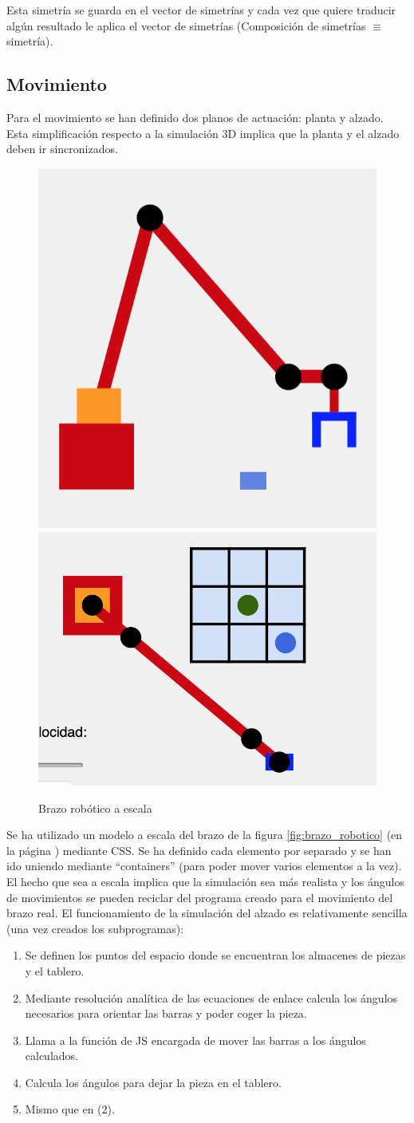 \documentclass[11pt]{article}
\begin{document}
Esta simetría se guarda en el vector de simetrías y cada vez que quiere traducir
algún resultado le aplica el vector de simetrías (Composición de simetrías $\equiv$
simetría).

\subsection{Movimiento}

Para el movimiento se han definido dos planos de actuación: planta y
alzado. Esta simplificación respecto a la simulación 3D implica que la planta y
el alzado deben ir sincronizados. \\

\begin{figure}[htbp]
  \centering
  \includegraphics[width = .3\textwidth]{Brazo_escala.png}
  \hspace{1.5cm}
  \includegraphics[width = .3\textwidth]{Planta_robot_escala.png}
  \caption{Brazo robótico a escala}
  \label{fig:brazo_escala}
\end{figure}

Se ha utilizado un modelo a escala del brazo de la figura
\ref{fig:brazo_robotico} (en la página \pageref{fig:brazo_robotico}) mediante
CSS. Se ha definido cada elemento por separado y se han ido uniendo mediante
``containers'' (para poder mover varios elementos a la vez). \\

El hecho que sea a escala implica que la simulación sea más realista y los
ángulos de movimientos se pueden reciclar del programa creado para el movimiento
del brazo real. El funcionamiento de la simulación del alzado es relativamente
sencilla (una vez creados los subprogramas):

\begin{enumerate}
  \item Se definen los puntos del espacio donde se encuentran los almacenes de
  piezas y el tablero.
  \item Mediante resolución analítica de las ecuaciones de enlace calcula los
  ángulos necesarios para orientar las barras y poder coger la pieza.
  \item Llama a la función de JS encargada de mover las barras a los ángulos
  calculados.
  \item Calcula los ángulos para dejar la pieza en el tablero.
  \item Mismo que en (2).
\end{enumerate}
\end{document}
